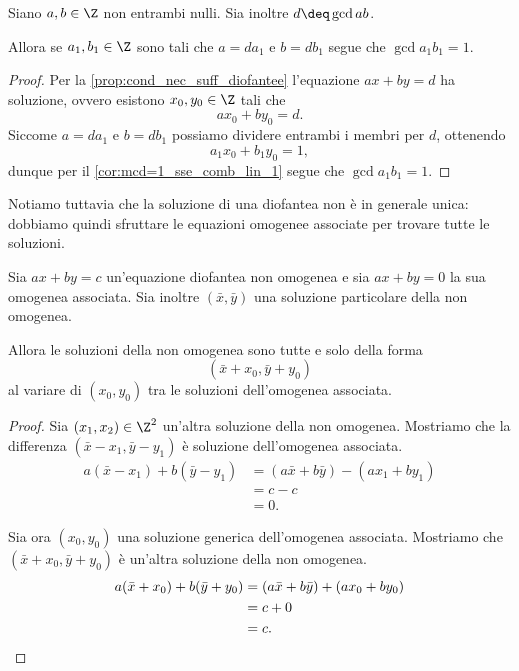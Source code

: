 \begin{corollary}
    Siano $a, b \in \Z$ non entrambi nulli. Sia inoltre $d \deq \gcd{a}{b}$.

    Allora se $a_1, b_1 \in \Z$ sono tali che $a = da_1$ e $b = db_1$ segue che $\gcd{a_1}{b_1} = 1$.
\end{corollary}
\begin{proof}
    Per la \autoref{prop:cond_nec_suff_diofantee} l'equazione $ax + by = d$ ha soluzione, ovvero esistono $x_0, y_0 \in \Z$ tali che \[
        ax_0 + by_0 = d.
    \] Siccome $a = da_1$ e $b = db_1$ possiamo dividere entrambi i membri per $d$, ottenendo \[
        a_1x_0 + b_1y_0 = 1,    
    \] dunque per il \autoref{cor:mcd=1_sse_comb_lin_1} segue che $\gcd{a_1}{b_1} = 1$.
\end{proof}

Notiamo tuttavia che la soluzione di una diofantea non è in generale unica: dobbiamo quindi sfruttare le equazioni omogenee associate per trovare tutte le soluzioni.

\begin{proposition}
    Sia $ax + by = c$ un'equazione diofantea non omogenea e sia $ax + by = 0$ la sua omogenea associata.
    Sia inoltre $(\bar x, \bar y)$ una soluzione particolare della non omogenea. 
    
    Allora le soluzioni della non omogenea sono tutte e solo della forma \begin{equation}
        (\bar x + x_0, \bar y + y_0)
    \end{equation} al variare di $(x_0, y_0)$ tra le soluzioni dell'omogenea associata.
\end{proposition}
\begin{proof}
    Sia $(x_1, x_2) \in \Z^2$ un'altra soluzione della non omogenea. Mostriamo che la differenza $(\bar x - x_1, \bar y - y_1)$ è soluzione dell'omogenea associata.
    \begin{align*}
        a(\bar x - x_1) + b(\bar y - y_1) &= (a\bar x + b\bar y) - (ax_1 + by_1) \\
        &= c - c \\
        &= 0.
    \end{align*}

    Sia ora $(x_0, y_0)$ una soluzione generica dell'omogenea associata. Mostriamo che $(\bar x + x_0, \bar y + y_0)$ è un'altra soluzione della non omogenea.
    \begin{align*}
        a(\bar x + x_0) + b(\bar y + y_0) &= (a\bar x + b\bar y) + (ax_0 + by_0) \\
        &= c + 0 \\
        &= c. \qedhere
    \end{align*}
\end{proof}

